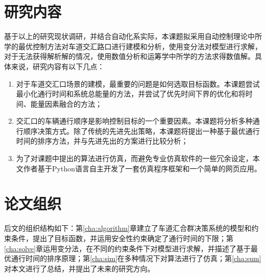 \section{研究内容}
基于以上的研究现状调研，并结合自动化系实际，本课题拟采用自动控制理论中所学的最优控制方法对车道交汇路口进行建模和分析，使用变分法对模型进行求解，对于无法获得解析解的情况，使用数值分析和运筹学中所学的方法求得数值解。具体来说，研究内容有以下几点：
\begin{enumerate}[label=(\arabic*)]
\item 对于车道交汇口场景的建模，最重要的问题是如何选取目标函数。本课题尝试最小化通行时间和系统总能量的方法，并尝试了优先时间下界的优化和将时间、能量因素融合的方法；
\item 交汇口的车辆通行顺序是影响控制目标的一个重要因素。本课题将分析多种通行顺序决策方式。除了传统的先进先出策略，本课题将提出一种基于最优通行时间的排序方法，并与先进先出的方案进行比较分析；
\item 为了对课题中提出的算法进行仿真，而避免专业仿真软件的一些冗余设定，本文作者基于{\ttfamily Python}语言自主开发了一套仿真程序框架和一个简单的网页应用。
\end{enumerate}

\section{论文组织}
后文的组织结构如下：第\ref{cha:algorithm}章建立了车道汇合群决策系统的模型和约束条件，提出了目标函数，并运用安全性约束确定了通行时间的下限；第\ref{cha:solve}章运用变分法，在不同的约束条件下对模型进行求解，并描述了基于最优通行时间的排序原理；第\ref{cha:sim}在多种情况下对算法进行了仿真；第\ref{cha:sum}对本文进行了总结，并提出了未来的研究方向。